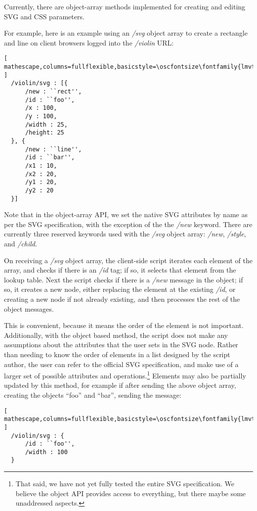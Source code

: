 Currently, there are object-array methods implemented for creating and editing SVG and CSS parameters.

For example, here is an example using an \textit{/svg} object array to create a rectangle and line on client browsers logged into the \textit{/violin} URL:

\begin{lstlisting}[ mathescape,columns=fullflexible,basicstyle=\oscfontsize\fontfamily{lmvtt}\selectfont ]
  /violin/svg : [{
      /new : ``rect'',
      /id : ``foo'',
      /x : 100,
      /y : 100,
      /width : 25,
      /height: 25
  }, {
      /new : ``line'',
      /id : ``bar'',
      /x1 : 10,
      /x2 : 20,
      /y1 : 20,
      /y2 : 20
  }]
\end{lstlisting}

\noindent
Note that in the object-array API, we set the native SVG attributes by name as per the SVG specification, with the exception of the the \textit{/new} keyword.
There are currently three reserved keywords used with the \textit{/svg} object array: \textit{/new}, \textit{/style}, and \textit{/child}.

On receiving a \textit{/svg} object array, the client-side script iterates each element of the array, and checks if there is an \textit{/id} tag; if so, it selects that element from the lookup table.
Next the script checks if there is a \textit{/new} message in the object; if so, it creates a new node, either replacing the element at the existing \textit{/id}, or creating a new node if not already existing, and then processes the rest of the object messages.

This is convenient, because it means the order of the element is not important.
Additionally, with the object based method, the script does not make any assumptions about the attributes that the user sets in the SVG node.
Rather than needing to know the order of elements in a list designed by the script author, the user can refer to the official SVG specification, and make use of a larger set of possible attributes and operations.\footnote{That said, we have not yet fully tested the entire SVG specification. We believe the object API provides access to everything, but there maybe some unaddressed aspects.} 
Elements may also be partially updated by this method, for example if after sending the above object array, creating the objects ``foo'' and ``bar'', sending the message:

\begin{lstlisting}[ mathescape,columns=fullflexible,basicstyle=\oscfontsize\fontfamily{lmvtt}\selectfont ]
  /violin/svg : {
      /id : ``foo'',
      /width : 100
  }
  \end{lstlisting}

